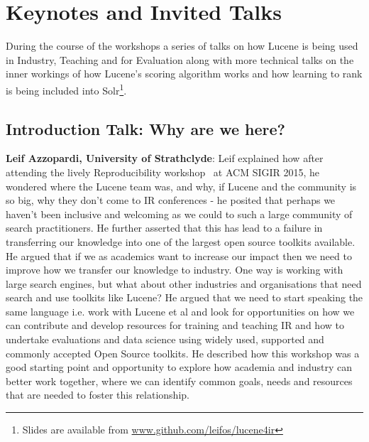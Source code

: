 \section{Keynotes and Invited Talks}
During the course of the workshops a series of talks on how Lucene is being used in Industry, Teaching and for Evaluation along with more technical talks on the inner workings of how Lucene's scoring algorithm works and how learning to rank is being included into Solr\footnote{\scriptsize{Slides are available from \url{www.github.com/leifos/lucene4ir}}}. 

\subsection*{Introduction Talk: Why are we here?}
{\bf Leif Azzopardi, University of Strathclyde}:
Leif explained how after attending the lively Reproducibility workshop~\cite{arguello2016repro} at ACM SIGIR 2015, he wondered where the Lucene team was, and why, if Lucene and the community is so big, why they don't come to IR conferences - he posited that perhaps we haven't been inclusive and welcoming as we could to such a large community of search practitioners. He further asserted that this has lead to a failure in transferring our knowledge into one of the largest open source toolkits available. He argued that if we as academics want to increase our impact then we need to improve how we transfer our knowledge to industry. One way is working with large search engines, but what about other industries and organisations that need search and use toolkits like Lucene? He argued that we need to start speaking the same language i.e. work with Lucene et al and look for opportunities on how we can contribute and develop resources for training and teaching IR and how to undertake evaluations and data science using widely used, supported and commonly accepted Open Source toolkits. He described how this workshop was a good starting point and opportunity to explore how academia and industry can better work together, where we can identify common goals, needs and resources that are needed to foster this relationship. 










